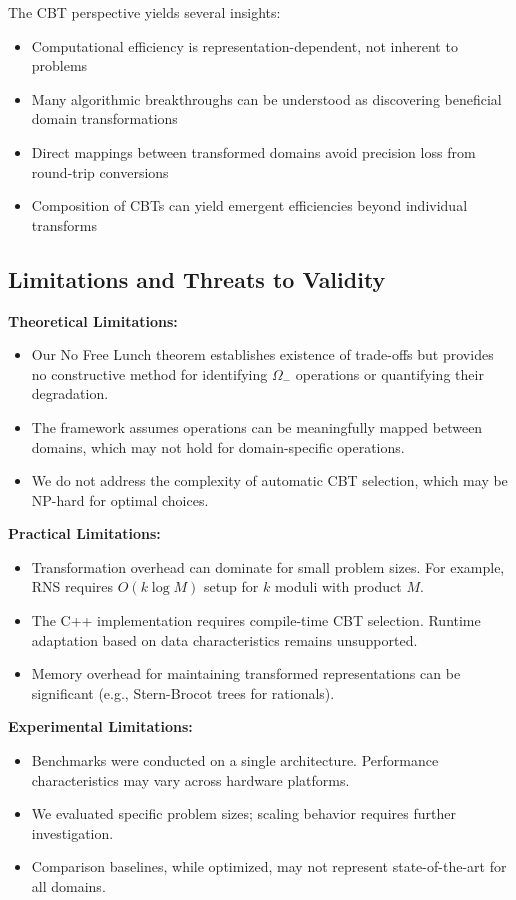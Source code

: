 \documentclass[11pt]{article}
\theoremstyle{definition}
\begin{document}
The CBT perspective yields several insights:
\begin{itemize}
\item Computational efficiency is representation-dependent, not inherent to problems
\item Many algorithmic breakthroughs can be understood as discovering beneficial domain transformations
\item Direct mappings between transformed domains avoid precision loss from round-trip conversions
\item Composition of CBTs can yield emergent efficiencies beyond individual transforms
\end{itemize}

\subsection{Limitations and Threats to Validity}

\textbf{Theoretical Limitations:}
\begin{itemize}
\item Our No Free Lunch theorem establishes existence of trade-offs but provides no constructive method for identifying $\Omega_-$ operations or quantifying their degradation.
\item The framework assumes operations can be meaningfully mapped between domains, which may not hold for domain-specific operations.
\item We do not address the complexity of automatic CBT selection, which may be NP-hard for optimal choices.
\end{itemize}

\textbf{Practical Limitations:}
\begin{itemize}
\item Transformation overhead can dominate for small problem sizes. For example, RNS requires $O(k \log M)$ setup for $k$ moduli with product $M$.
\item The C++ implementation requires compile-time CBT selection. Runtime adaptation based on data characteristics remains unsupported.
\item Memory overhead for maintaining transformed representations can be significant (e.g., Stern-Brocot trees for rationals).
\end{itemize}

\textbf{Experimental Limitations:}
\begin{itemize}
\item Benchmarks were conducted on a single architecture. Performance characteristics may vary across hardware platforms.
\item We evaluated specific problem sizes; scaling behavior requires further investigation.
\item Comparison baselines, while optimized, may not represent state-of-the-art for all domains.
\end{itemize}
\end{document}
